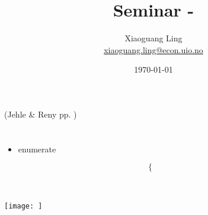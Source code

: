 \documentclass{article}
\title{Seminar  - }
\author{Xiaoguang Ling \\  \href{xiaoguang.ling@econ.uio.no}{xiaoguang.ling@econ.uio.no}}
\date{\today}
\begin{document}
\maketitle

(Jehle \& Reny pp. )
\section{}

\begin{mdframed}[backgroundcolor=blue!20,linecolor=white]

\end{mdframed}


\begin{mdframed}[backgroundcolor=yellow!20,linecolor=white]

\end{mdframed}




\begin{itemize}
\item enumerate
\end{itemize}


\begin{equation}
    \begin{cases}

    \end{cases}
    \label{eq:}   
\end{equation}


\begin{align*}


\end{align*}





\subsection{}

{\centering
\texttt{[image: ]}
\label{}}
\vspace{2mm}
\end{document}

